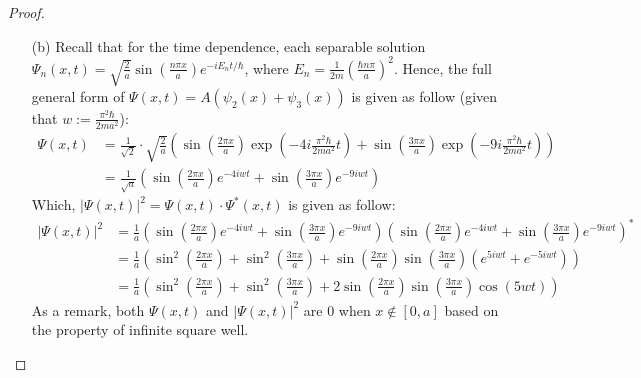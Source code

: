 \documentclass{article}
\begin{document}
\begin{proof}
\begin{itemize}
        \item[(b)] Recall that for the time dependence, each separable solution $\Psi_n(x,t)=\sqrt{\frac{2}{a}}\sin(\frac{n\pi x}{a})e^{-iE_n t/\hbar}$, where $E_n=\frac{1}{2m}\left(\frac{\hbar n\pi}{a}\right)^2$. Hence, the full general form of $\Psi(x,t)=A(\psi_2(x)+\psi_3(x))$ is given as follow (given that $w:=\frac{\pi^2\hbar}{2ma^2}$):
        \begin{align}
            \Psi(x,t)&=\frac{1}{\sqrt{2}}\cdot\sqrt{\frac{2}{a}}\left(\sin\left(\frac{2\pi x}{a}\right)\exp\left(-4i\frac{\pi^2 \hbar}{2ma^2}t\right)+\sin\left(\frac{3\pi x}{a}\right)\exp\left(-9i\frac{\pi^2 \hbar}{2ma^2}t\right)\right)\\
            &= \frac{1}{\sqrt{a}}\left(\sin\left(\frac{2\pi x}{a}\right)e^{-4iwt}+\sin\left(\frac{3\pi x}{a}\right)e^{-9iwt}\right)
        \end{align}
        Which, $|\Psi(x,t)|^2 = \Psi(x,t)\cdot \Psi^*(x,t)$ is given as follow:
        \begin{align}
            |\Psi(x,t)|^2 &= \frac{1}{a}\left(\sin\left(\frac{2\pi x}{a}\right)e^{-4iwt}+\sin\left(\frac{3\pi x}{a}\right)e^{-9iwt}\right)\left(\sin\left(\frac{2\pi x}{a}\right)e^{-4iwt}+\sin\left(\frac{3\pi x}{a}\right)e^{-9iwt}\right)^*\\
            &= \frac{1}{a}\left(\sin^2\left(\frac{2\pi x}{a}\right)+\sin^2\left(\frac{3\pi x}{a}\right)+\sin\left(\frac{2\pi x}{a}\right)\sin\left(\frac{3\pi x}{a}\right)\left(e^{5iwt}+e^{-5iwt}\right)\right)\\
            &= \frac{1}{a}\left(\sin^2\left(\frac{2\pi x}{a}\right)+\sin^2\left(\frac{3\pi x}{a}\right)+2\sin\left(\frac{2\pi x}{a}\right)\sin\left(\frac{3\pi x}{a}\right)\cos(5wt)\right)
        \end{align}
        As a remark, both $\Psi(x,t)$ and $|\Psi(x,t)|^2$ are $0$ when $x\notin [0,a]$ based on the property of infinite square well.

        \hfil


\end{itemize}
\end{proof}
\end{document}
